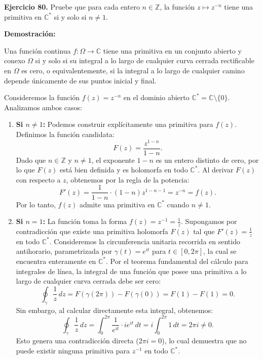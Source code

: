 \documentclass[11pt,a4paper]{article}
\theoremstyle{definition}
\theoremstyle{plain}
\theoremstyle{remark}
\begin{document}
	\noindent \textbf{Ejercicio 80.} Pruebe que para cada entero $n \in \mathbb{Z}$, la función $z \mapsto z^{-n}$ tiene una primitiva en $\mathbb{C}^*$ si y solo si $n \neq 1$.
	
	\vspace{1em}
	\noindent \textbf{Demostración:}
	
	Una función continua $f : \Omega \to \mathbb{C}$ tiene una primitiva en un conjunto abierto y conexo $\Omega$ si y solo si su integral a lo largo de cualquier curva cerrada rectificable en $\Omega$ es cero, o equivalentemente, si la integral a lo largo de cualquier camino depende únicamente de sus puntos inicial y final. 
	
	Consideremos la función $f(z) = z^{-n}$ en el dominio abierto $\mathbb{C}^* = \mathbb{C} \setminus \{0\}$. Analizamos ambos casos:
	
	\begin{enumerate}
		\item[\textbf{1.}] \textbf{Si $n \neq 1$:}
		Podemos construir explícitamente una primitiva para $f(z)$. Definimos la función candidata:
		\[
		F(z) = \frac{z^{1-n}}{1-n}.
		\]
		Dado que $n \in \mathbb{Z}$ y $n \neq 1$, el exponente $1-n$ es un entero distinto de cero, por lo que $F(z)$ está bien definida y es holomorfa en todo $\mathbb{C}^*$. Al derivar $F(z)$ con respecto a $z$, obtenemos por la regla de la potencia:
		\[
		F'(z) = \frac{1}{1-n} \cdot (1-n) z^{1-n-1} = z^{-n} = f(z).
		\]
		Por lo tanto, $f(z)$ admite una primitiva en $\mathbb{C}^*$ cuando $n \neq 1$.
		
		\item[\textbf{2.}] \textbf{Si $n = 1$:}
		La función toma la forma $f(z) = z^{-1} = \frac{1}{z}$. 
		Supongamos por contradicción que existe una primitiva holomorfa $F(z)$ tal que $F'(z) = \frac{1}{z}$ en todo $\mathbb{C}^*$. 
		Consideremos la circunferencia unitaria recorrida en sentido antihorario, parametrizada por $\gamma(t) = e^{it}$ para $t \in [0, 2\pi]$, la cual se encuentra enteramente en $\mathbb{C}^*$. 
		Por el teorema fundamental del cálculo para integrales de línea, la integral de una función que posee una primitiva a lo largo de cualquier curva cerrada debe ser cero:
		\[
		\oint_{\gamma} \frac{1}{z} \, dz = F(\gamma(2\pi)) - F(\gamma(0)) = F(1) - F(1) = 0.
		\]
		Sin embargo, al calcular directamente esta integral, obtenemos:
		\[
		\oint_{\gamma} \frac{1}{z} \, dz = \int_0^{2\pi} \frac{1}{e^{it}} \cdot i e^{it} \, dt = i \int_0^{2\pi} 1 \, dt = 2\pi i \neq 0.
		\]
		Esto genera una contradicción directa ($2\pi i = 0$), lo cual demuestra que no puede existir ninguna primitiva para $z^{-1}$ en todo $\mathbb{C}^*$.
	\end{enumerate}
	
\end{document}
